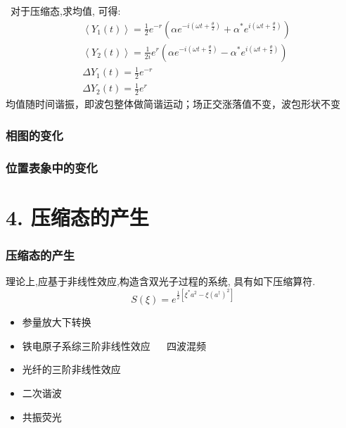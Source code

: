    \begin{frame}
    \frametitle{}
     对于压缩态,求均值, 可得: 
    \[ 
        \begin{aligned}
            &\left\langle Y_{1}(t)\right\rangle=\frac{1}{2} e^{-r}\left(\alpha e^{-i\left(\omega t+\frac{\theta}{2}\right)}+\alpha^{*} e^{i\left(\omega t+\frac{\theta}{2}\right)}\right) \\
            &\left\langle Y_{2}(t)\right\rangle=\frac{1}{2 i} e^{r}\left(\alpha e^{-i\left(\omega t+\frac{\theta}{2}\right)}-\alpha^{*} e^{i\left(\omega t+\frac{\theta}{2}\right)}\right) \\
            &\Delta Y_{1}(t)=\frac{1}{2} e^{-r} \\
            &\Delta Y_{2}(t)=\frac{1}{2} e^{r}
            \end{aligned} \]
    均值随时间谐振，即波包整体做简谐运动；场正交涨落值不变，波包形状不变  \\ 
   \end{frame}

   \begin{frame} 
   \frametitle{相图的变化}
   \begin{center}
    \end{center} 
   \end{frame}

   \begin{frame} 
    \frametitle{位置表象中的变化}
    \begin{center}
        
     \end{center} 
    \end{frame}

   \section{4. 压缩态的产生}

   \begin{frame}
    \frametitle{压缩态的产生}
  理论上,应基于非线性效应,构造含双光子过程的系统, 具有如下压缩算符. 
  \[ S(\xi) = e^{\frac{1}{2}[\xi^* a^2 - \xi (a^{\dagger}) ^2]}\]

  \begin{itemize}
      \item  参量放大下转换
      \item  铁电原子系综三阶非线性效应 ~~ 四波混频
      \item  光纤的三阶非线性效应
      \item  二次谐波
      \item  共振荧光
  \end{itemize}

  \end{frame}
  

